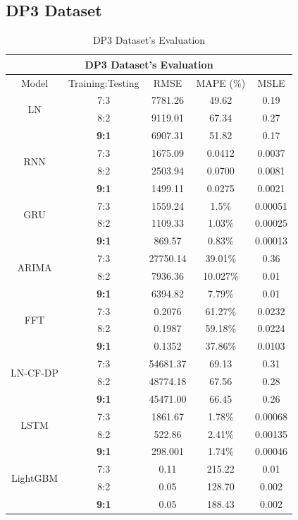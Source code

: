 \documentclass{ieeeojies}
\begin{document}
\vspace{-1em}

\subsection{DP3 Dataset}
\begin{table}[H]
    \centering
    \begin{tabular}{|c|c|c|c|c|}
         \hline
         \multicolumn{5}{|c|}{\textbf{DP3 Dataset's Evaluation}}\\
         \hline
         \centering Model & Training:Testing & RMSE & MAPE (\%) & MSLE\\
         \hline
         \multirow{2}{*}{LN}& 7:3 & 7781.26 & 49.62 & 0.19\\ & 8:2 & 9119.01 & 67.34 & 0.27\\ & \textbf{9:1}& 6907.31& 51.82 & 0.17\\
         \hline
         \multirow{2}{*}{RNN} & 7:3&1675.09&0.0412&0.0037\\ & 8:2&2503.94&0.0700&0.0081\\ & \textbf{9:1} & 1499.11&0.0275 &0.0021 \\
         \hline
         \multirow{2}{*}{GRU} & 7:3	& 1559.24 & 1.5\% & 0.00051 \\ & 8:2 & 1109.33 & 1.03\% & 0.00025 \\ & \textbf{9:1} & 869.57 & 0.83\% & 0.00013 \\
         \hline
         \multirow{2}{*}{ARIMA} & 7:3 & 27750.14  & 39.01\%  &  0.36 \\ & 8:2 & 7936.36  & 10.027\% & 0.01 \\ & \textbf{9:1} & 6394.82 & 7.79\% & 0.01 \\
         \hline
         \multirow{2}{*}{FFT}& 7:3& 0.2076& 61.27\%&0.0232 \\ & 8:2 & 0.1987& 59.18\%& 0.0224\\ & \textbf{9:1}& 0.1352& 37.86\%& 0.0103\\
         \hline
         \multirow{2}{*}{LN-CF-DP} & 7:3 & 54681.37 & 69.13 & 0.31 \\ & {8:2} & 48774.18 & 67.56 & 0.28 \\ & \textbf{9:1} & 45471.00 &66.45&0.26\\
         \hline
         \multirow{2}{*}{LSTM}& 7:3& 1861.67& 1.78\%& 0.00068\\ & 8:2 & 522.86& 2.41\%& 0.00135\\ & \textbf{9:1}& 298.001& 1.74\%& 0.00046\\
         \hline
         \multirow{2}{*}{LightGBM}& 7:3& 0.11& 215.22 & 0.01\\ & 8:2 & 0.05& 128.70 & 0.002\\ & \textbf{9:1}& 0.05& 188.43 & 0.002\\
         \hline
    \end{tabular}
    \caption{DP3 Dataset's Evaluation}
    \label{dp3result}
\end{table}
\end{document}
